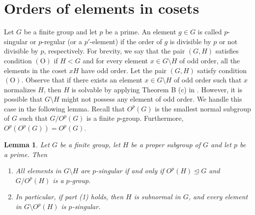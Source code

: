 \documentclass[twoside,a4paper,reqno,11pt]{amsart}
\newcommand{\<}{\langle}
\renewcommand{\>}{\rangle}
\newcommand{\OO}{\mathrm {(O)}}
\renewcommand{\:}{\colon}
\newtheorem{lem}[thm]{Lemma}
\theoremstyle{definition}
\begin{document}
\section{Orders of elements in cosets}\label{sec5}

Let $G$ be a finite group and let $p$ be a prime. An element $g\in G$ is called $p$-singular or $p$-regular (or a $p'$-element) if the order of $g$ is divisible by $p$ or not divisible by $p$, respectively.
For brevity, we say that the pair $(G,H)$ satisfies condition $\OO$ if $H<G$ and for every element $x\in G\setminus H$ of odd order, all the elements in the coset $xH$ have odd order. Let the pair $(G,H)$ satisfy condition $\OO$. Observe that if there exists an element  $x\in G\setminus H$ of odd order such that $x$ normalizes $H$, then $H$ is solvable by applying Theorem B (c) in \cite{GN}.  However, it is possible that $G\setminus H$ might not possess any element of odd order. We handle this case in the following lemma. Recall that $O^p(G)$ is the smallest normal subgroup of $G$ such that $G/O^p(G)$ is a finite $p$-group. Furthermore, $O^p(O^p(G))=O^p(G)$.



\begin{lem}\label{lem:p-singular}
Let $G$ be a finite group, let $H$ be a  proper subgroup of $G$ and let $p$ be a prime. Then  

\begin{enumerate}
\item[$(1)$] All elements  in $G\setminus H$ are $p$-singular if and only if  $O^p(H)\unlhd G$ and $G/O^p(H)$ is a $p$-group. 
\item[$(2)$] In particular, if  part (1) holds, then $H$ is subnormal in $G$, and every element in $G\setminus O^p(H)$ is $p$-singular. 
\end{enumerate}
\end{lem}
\end{document}
